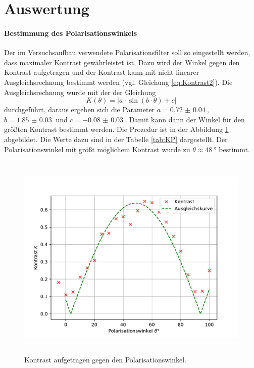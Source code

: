 \section{Auswertung}
\label{sec:Auswertung}
\paragraph{Bestimmung des Polarisationswinkels}
Der im Versuchsaufbau verwendete Polarisationsfilter soll so eingestellt werden, dass maximaler Kontrast 
gewährleistet ist. Dazu wird der Winkel gegen den Kontrast aufgetragen und der Kontrast kann mit nicht-linearer 
Ausgleichsrechnung bestimmt werden (vgl. Gleichung \eqref{eq:Kontrast2}). 
Die Ausgleichsrechnung wurde mit der der Gleichung 
\begin{equation*}
K(\theta) = \lvert a \cdot \sin(b \cdot \theta) +c \rvert	
\end{equation*}
durchgeführt, daraus ergeben sich die Parameter $a = \SI{0.72(4)}{}$, $b = \SI{1.85(3)}{}$ und 
$c = \SI{-0.08(3)}{}$.
Damit kann dann der Winkel für den größten Kontrast bestimmt werden. Die 
Prozedur ist in der Abbildung \ref{fig:K} abgebildet. Die Werte dazu sind in der Tabelle \ref{tab:KP} 
dargestellt. Der Polarisationswinkel mit größt möglichem Kontrast 
wurde zu $\theta \approx \SI{48}{\degree}$ bestimmt.
\begin{figure}
  \centering
  \includegraphics[height = 10cm]{plots/Kontrastfit.pdf}
  \caption{Kontrast aufgetragen gegen den Polarisationswinkel.}
  \label{fig:K}
\end{figure}
